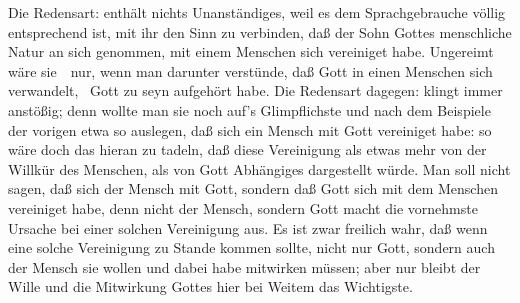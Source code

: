 \begin{aufza}
\item Die Redensart:  enthält nichts Unanständiges, weil es dem Sprachgebrauche völlig entsprechend ist, mit ihr den Sinn zu verbinden, daß der Sohn Gottes menschliche Natur an sich genommen, mit einem Menschen sich vereiniget habe. Ungereimt wäre sie~\ nur, wenn man darunter verstünde, daß Gott in einen Menschen sich verwandelt, \dh\ Gott zu seyn aufgehört habe. Die Redensart dagegen:  klingt immer anstößig; denn wollte man sie noch auf's Glimpflichste und nach dem Beispiele der vorigen etwa so auslegen, daß sich ein Mensch mit Gott vereiniget habe: so wäre doch das hieran zu tadeln, daß diese Vereinigung als etwas mehr von der Willkür des Menschen, als von Gott Abhängiges dargestellt würde. Man soll nicht sagen, daß sich der Mensch mit Gott, sondern daß Gott sich mit dem Menschen vereiniget habe, denn nicht der Mensch, sondern Gott macht die vornehmste Ursache bei einer solchen Vereinigung aus. Es ist zwar freilich wahr, daß wenn eine solche Vereinigung zu Stande kommen sollte, nicht nur Gott, sondern auch der Mensch sie wollen und dabei habe mitwirken müssen; aber nur bleibt der Wille und die Mitwirkung Gottes hier bei Weitem das Wichtigste.
\end{aufza}
